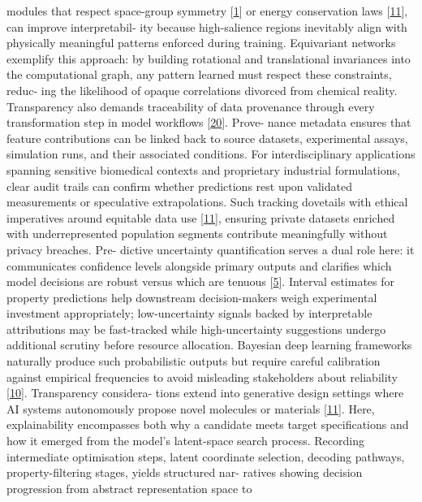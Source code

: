 \documentclass[
]{article}
\begin{document}
modules that respect space-group symmetry
{[}\protect\hyperlink{_bookmark41}{1}{]} or energy conservation laws
{[}\protect\hyperlink{_bookmark51}{11}{]}, can improve interpretabil-
ity because high-salience regions inevitably align with physically
meaningful patterns enforced during training. Equivariant networks
exemplify this approach: by building rotational and translational
invariances into the computational graph, any pattern learned must
respect these constraints, reduc- ing the likelihood of opaque
correlations divorced from chemical reality. Transparency also demands
traceability of data provenance through every transformation step in
model workflows {[}\protect\hyperlink{_bookmark60}{20}{]}. Prove- nance
metadata ensures that feature contributions can be linked back to source
datasets, experimental assays, simulation runs, and their associated
conditions. For interdisciplinary applications spanning sensitive
biomedical contexts and proprietary industrial formulations, clear audit
trails can confirm whether predictions rest upon validated measurements
or speculative extrapolations. Such tracking dovetails with ethical
imperatives around equitable data use
{[}\protect\hyperlink{_bookmark51}{11}{]}, ensuring private datasets
enriched with underrepresented population segments contribute
meaningfully without privacy breaches. Pre- dictive uncertainty
quantification serves a dual role here: it communicates confidence
levels alongside primary outputs and clarifies which model decisions are
robust versus which are tenuous
{[}\protect\hyperlink{_bookmark45}{5}{]}. Interval estimates for
property predictions help downstream decision-makers weigh experimental
investment appropriately; low-uncertainty signals backed by
interpretable attributions may be fast-tracked while high-uncertainty
suggestions undergo additional scrutiny before resource allocation.
Bayesian deep learning frameworks naturally produce such probabilistic
outputs but require careful calibration against empirical frequencies to
avoid misleading stakeholders about reliability
{[}\protect\hyperlink{_bookmark50}{10}{]}. Transparency considera- tions
extend into generative design settings where AI systems autonomously
propose novel molecules or materials
{[}\protect\hyperlink{_bookmark51}{11}{]}. Here, explainability
encompasses both why a candidate meets target specifications and how it
emerged from the model's latent-space search process. Recording
intermediate optimisation steps, latent coordinate selection, decoding
pathways, property-filtering stages, yields structured nar- ratives
showing decision progression from abstract representation space to
\end{document}

